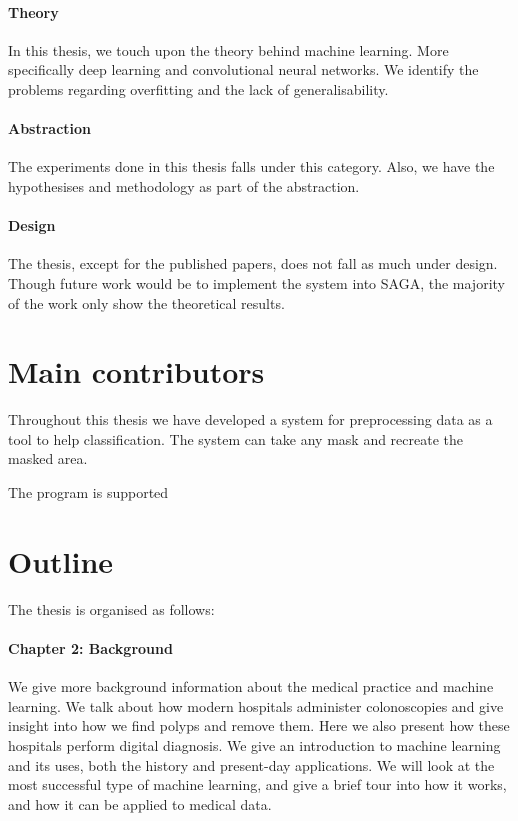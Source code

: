 \paragraph{Theory}
In this thesis, we touch upon the theory behind machine learning. More specifically deep learning and convolutional neural networks. We identify the problems regarding overfitting and the lack of generalisability.

\paragraph{Abstraction}
The experiments done in this thesis falls under this category. Also, we have the hypothesises and methodology as part of the abstraction.

\paragraph{Design}
The thesis, except for the published papers, does not fall as much under design. Though future work would be to implement the system into SAGA, the majority of the work only show the theoretical results. 





\section{Main contributors}
Throughout this thesis we have developed a system for preprocessing data as a tool to help classification. 
The system can take any mask and recreate the masked area.



The program is supported

\section{Outline}
The thesis is organised as follows:

\paragraph{Chapter 2: Background}
We give more background information about the medical practice and machine learning.
We talk about how modern hospitals administer colonoscopies and give insight into how we find polyps and remove them. Here we also present how these hospitals perform digital diagnosis.  
We give an introduction to machine learning and its uses, both the history and present-day applications. We will look at the most successful type of machine learning, and give a brief tour into how it works, and how it can be applied to medical data.

